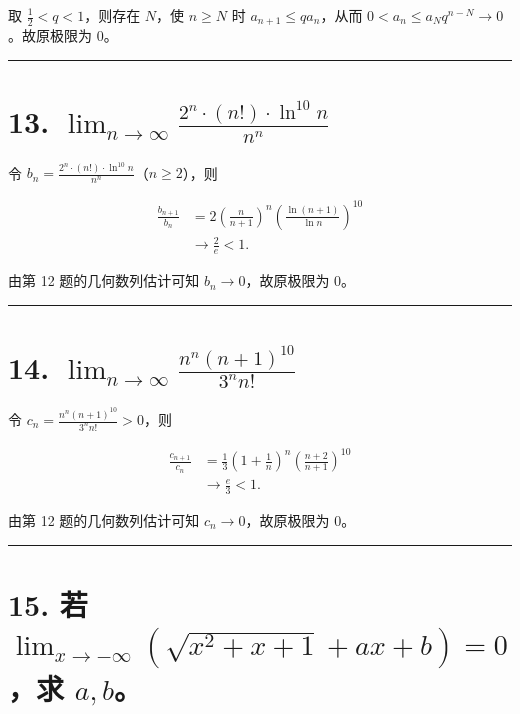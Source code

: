 \documentclass[11pt,a4paper,fontset=windows]{ctexart}
\begin{document}
取 \(\frac12<q<1\)，则存在 \(N\)，使 \(n\ge N\) 时 \(a_{n+1}\le q a_n\)，从而
\(0<a_n\le a_Nq^{n-N}\to0\)。故原极限为 \(\boxed{0}\)。

\par{}\vspace{0.5em}\hrule\vspace{0.2em}
\section*{13. \(\displaystyle\lim_{n\to\infty}\frac{2^n\cdot(n!)\cdot\ln^{10}n}{n^n}\)}

令 \(b_n=\frac{2^n\cdot(n!)\cdot\ln^{10}n}{n^n}\)（\(n\ge2\)），则

\[
\begin{aligned}
\frac{b_{n+1}}{b_n}
&=2\left(\frac n{n+1}\right)^n
\left(\frac{\ln(n+1)}{\ln n}\right)^{10}\\
&\longrightarrow\frac2e<1.
\end{aligned}
\]

由第 12 题的几何数列估计可知 \(b_n\to0\)，故原极限为 \(\boxed{0}\)。

\par{}\vspace{0.5em}\hrule\vspace{0.2em}
\section*{14. \(\displaystyle\lim_{n\to\infty}\frac{n^n(n+1)^{10}}{3^n n!}\)}

令 \(c_n=\frac{n^n(n+1)^{10}}{3^n n!}>0\)，则

\[
\begin{aligned}
\frac{c_{n+1}}{c_n}
&=\frac13\left(1+\frac1n\right)^n
\left(\frac{n+2}{n+1}\right)^{10}\\
&\longrightarrow\frac e3<1.
\end{aligned}
\]

由第 12 题的几何数列估计可知 \(c_n\to0\)，故原极限为 \(\boxed{0}\)。

\par{}\vspace{0.5em}\hrule\vspace{0.2em}
\section*{15. 若 \(\displaystyle\lim_{x\to-\infty}\left(\sqrt{x^2+x+1}+ax+b\right)=0\)，求 \(a,b\)。}
\end{document}

